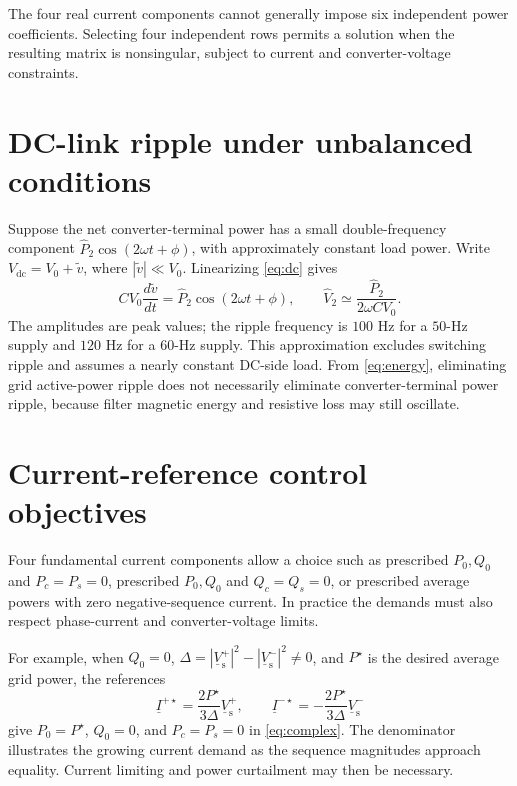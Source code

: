 The four real current components cannot generally impose six independent power coefficients. Selecting four independent rows permits a solution when the resulting matrix is nonsingular, subject to current and converter-voltage constraints.

\section{DC-link ripple under unbalanced conditions}
Suppose the net converter-terminal power has a small double-frequency component \(\widehat P_2\cos(2\omega t+\phi)\), with approximately constant load power. Write \(V_{\mathrm{dc}}=V_0+\widetilde v\), where \(|\widetilde v|\ll V_0\). Linearizing \eqref{eq:dc} gives
\begin{equation}\label{eq:ripple}
CV_0\frac{d\widetilde v}{dt}=\widehat P_2\cos(2\omega t+\phi),\qquad
\widehat V_2\simeq\frac{\widehat P_2}{2\omega CV_0}.
\end{equation}
The amplitudes are peak values; the ripple frequency is \(100\) Hz for a \(50\)-Hz supply and \(120\) Hz for a \(60\)-Hz supply. This approximation excludes switching ripple and assumes a nearly constant DC-side load. From \eqref{eq:energy}, eliminating grid active-power ripple does not necessarily eliminate converter-terminal power ripple, because filter magnetic energy and resistive loss may still oscillate.

\section{Current-reference control objectives}
Four fundamental current components allow a choice such as prescribed \(P_0,Q_0\) and \(P_c=P_s=0\), prescribed \(P_0,Q_0\) and \(Q_c=Q_s=0\), or prescribed average powers with zero negative-sequence current. In practice the demands must also respect phase-current and converter-voltage limits.

For example, when \(Q_0=0\), \(\Delta=|\underline V_{\mathrm{s}}^+|^2-|\underline V_{\mathrm{s}}^-|^2\ne0\), and \(P^\star\) is the desired average grid power, the references
\begin{equation}\label{eq:ipc}
\underline I^{+\star}=\frac{2P^\star}{3\Delta}\underline V_{\mathrm{s}}^+,\qquad
\underline I^{-\star}=-\frac{2P^\star}{3\Delta}\underline V_{\mathrm{s}}^-
\end{equation}
give \(P_0=P^\star\), \(Q_0=0\), and \(P_c=P_s=0\) in \eqref{eq:complex}. The denominator illustrates the growing current demand as the sequence magnitudes approach equality. Current limiting and power curtailment may then be necessary.

